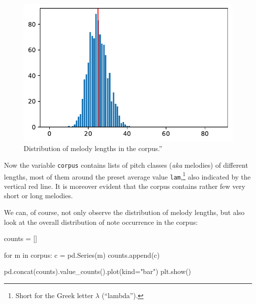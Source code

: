 \documentclass[
  a4paperpaper,
  ,captions=tableheading
]{scrbook}
\newenvironment{Shaded}{\begin{snugshade}}{\end{snugshade}}
\newcommand{\ControlFlowTok}[1]{\textcolor[rgb]{0.00,0.23,0.31}{#1}}
\newcommand{\KeywordTok}[1]{\textcolor[rgb]{0.00,0.23,0.31}{#1}}
\newcommand{\NormalTok}[1]{\textcolor[rgb]{0.00,0.23,0.31}{#1}}
\newcommand{\OperatorTok}[1]{\textcolor[rgb]{0.37,0.37,0.37}{#1}}
\newcommand{\StringTok}[1]{\textcolor[rgb]{0.13,0.47,0.30}{#1}}
\begin{document}
\begin{figure}[H]

{\centering \includegraphics{randomness_files/figure-pdf/fig-piece-lengths-output-1.pdf}

}

\caption{\label{fig-piece-lengths}Distribution of melody lengths in the
corpus.''}

\end{figure}

Now the variable \texttt{corpus} contains lists of pitch classes
(\emph{aka} melodies) of different lengths, most of them around the
preset average value \texttt{lam},\footnote{Short for the Greek letter
  \(\lambda\) (``lambda'').} also indicated by the vertical red line. It
is moreover evident that the corpus contains rather few very short or
long melodies.

We can, of course, not only observe the distribution of melody lengths,
but also look at the overall distribution of note occurrence in the
corpus:

\begin{Shaded}
\begin{Highlighting}[]
\NormalTok{counts }\OperatorTok{=}\NormalTok{ []}

\ControlFlowTok{for}\NormalTok{ m }\KeywordTok{in}\NormalTok{ corpus:}
\NormalTok{    c }\OperatorTok{=}\NormalTok{ pd.Series(m)}
\NormalTok{    counts.append(c)}

\NormalTok{pd.concat(counts).value\_counts().plot(kind}\OperatorTok{=}\StringTok{"bar"}\NormalTok{)}
\NormalTok{plt.show()}
\end{Highlighting}
\end{Shaded}
\end{document}
